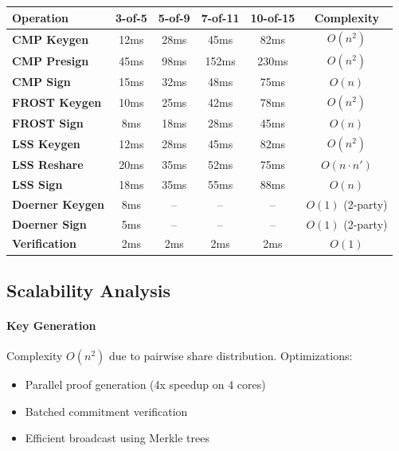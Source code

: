 \documentclass[11pt,twocolumn]{article}
\begin{document}
\begin{table}[t]
\centering
\begin{tabular}{@{}lccccc@{}}
\toprule
\textbf{Operation} & \textbf{3-of-5} & \textbf{5-of-9} & \textbf{7-of-11} & \textbf{10-of-15} & \textbf{Complexity} \\
\midrule
\textbf{CMP Keygen} & 12ms & 28ms & 45ms & 82ms & $O(n^2)$ \\
\textbf{CMP Presign} & 45ms & 98ms & 152ms & 230ms & $O(n^2)$ \\
\textbf{CMP Sign} & 15ms & 32ms & 48ms & 75ms & $O(n)$ \\
\midrule
\textbf{FROST Keygen} & 10ms & 25ms & 42ms & 78ms & $O(n^2)$ \\
\textbf{FROST Sign} & 8ms & 18ms & 28ms & 45ms & $O(n)$ \\
\midrule
\textbf{LSS Keygen} & 12ms & 28ms & 45ms & 82ms & $O(n^2)$ \\
\textbf{LSS Reshare} & 20ms & 35ms & 52ms & 75ms & $O(n \cdot n')$ \\
\textbf{LSS Sign} & 18ms & 35ms & 55ms & 88ms & $O(n)$ \\
\midrule
\textbf{Doerner Keygen} & 8ms & -- & -- & -- & $O(1)$ (2-party) \\
\textbf{Doerner Sign} & 5ms & -- & -- & -- & $O(1)$ (2-party) \\
\midrule
\textbf{Verification} & 2ms & 2ms & 2ms & 2ms & $O(1)$ \\
\bottomrule
\end{tabular}

\label{tab:benchmarks}
\end{table}

\subsection{Scalability Analysis}

\paragraph{Key Generation} Complexity $O(n^2)$ due to pairwise share distribution. Optimizations:
\begin{itemize}
\item Parallel proof generation (4x speedup on 4 cores)
\item Batched commitment verification
\item Efficient broadcast using Merkle trees
\end{itemize}
\end{document}
